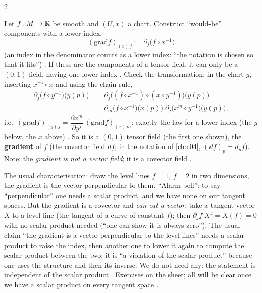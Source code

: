 \begin{paracol}{2}
\begin{example}\label{ex:tf-gradient}
Let $f\colon M\to\mathbb{R}$ be smooth and $(U,x)$ a chart. Construct ``would-be'' components with a lower index,
\[
  (\mathrm{grad}f)_{(x)\,j}:=\partial_j\bigl(f\circ x^{-1}\bigr)
\]
(an index in the denominator counts as a lower index: ``the notation is chosen so that it fits'')
.
If these are the components of a tensor field, it can only be a $(0,1)$ field, having one lower index
. Check the transformation: in the chart $y$, inserting $x^{-1}\circ x$ and
using the chain rule,
\begin{align*}
  \partial_j\bigl(f\circ y^{-1}\bigr)\bigl(y(p)\bigr)
  &=\partial_j\bigl((f\circ x^{-1})\circ(x\circ y^{-1})\bigr)\bigl(y(p)\bigr)\\
  &=\partial_m\bigl(f\circ x^{-1}\bigr)\bigl(x(p)\bigr)\;\partial_j\bigl(x^m\circ y^{-1}\bigr)\bigl(y(p)\bigr),
\end{align*}
i.e.\ $(\mathrm{grad} f)_{(y)\,j}=\dfrac{\partial x^m}{\partial y^j}\,(\mathrm{grad}f)_{(x)\,m}$: exactly the law for a lower
index (the $y$ below, the $x$ above) .
So it is a $(0,1)$ tensor field (the first one shown), the \textbf{gradient} of $f$ (the covector field $df$; in the notation of
\cref{ch:c04}, $(df)_p=d_pf$). Note: the \emph{gradient is not a vector field}; it is a covector field
.
\end{example}

\begin{aside}
The usual characterisation: draw the level lines $f=1$, $f=2$ in two dimensions, the gradient is the vector perpendicular to
them. ``Alarm bell'': to say ``perpendicular'' one needs a scalar product, and we have none on our tangent spaces. But the
gradient is a covector and \emph{can eat a vector}: take a tangent vector $X$ to a level line (the tangent of a curve of
constant $f$); then $\partial_jf\;X^j=X(f)=0$ with no scalar product needed (``one can show it is always zero''). The
usual claim ``the gradient is a vector perpendicular to the level lines'' needs a scalar product to raise the index, then
another one to lower it again to compute the scalar product between the two: it is ``a violation of the scalar product''
because one uses the structure and then its inverse. We do not need any: the statement is independent of the scalar product
.
Exercises on the sheet; all will be clear once we have a scalar product on every tangent space .
\end{aside}


\end{paracol}
